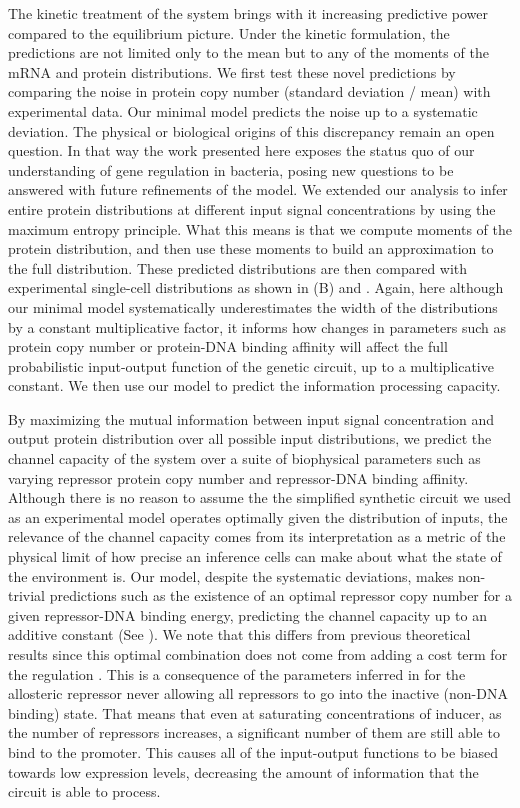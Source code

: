 The kinetic treatment of the system brings with it increasing predictive power
compared to the equilibrium picture. Under the kinetic formulation, the
predictions are not limited only to the mean but to any of the moments of the
mRNA and protein distributions. We first test these novel predictions by
comparing the noise in protein copy number (standard deviation / mean) with
experimental data. Our minimal model predicts the noise up to a systematic
deviation. The physical or biological origins of this discrepancy remain an
open question. In that way the work presented here exposes the status quo of
our understanding of gene regulation in bacteria, posing new questions to be
answered with future refinements of the model. We extended our analysis to
infer entire protein distributions at different input signal concentrations by
using the maximum entropy principle. What this means is that we compute moments
of the protein distribution, and then use these moments to build an
approximation to the full distribution. These predicted distributions are then
compared with experimental single-cell distributions as shown in
(B) and . Again, here although our minimal
model systematically underestimates the width of the distributions by a
constant multiplicative factor, it informs how changes in parameters such as
protein copy number or protein-DNA binding affinity will affect the full
probabilistic input-output function of the genetic circuit, up to a
multiplicative constant. We then use our model to predict the information
processing capacity.

By maximizing the mutual information between input signal concentration and
output protein distribution over all possible input distributions, we predict
the channel capacity of the system over a suite of biophysical parameters such
as varying repressor protein copy number and repressor-DNA binding affinity.
Although there is no reason to assume the the simplified synthetic circuit we
used as an experimental model operates optimally given the distribution of
inputs, the relevance of the channel capacity comes from its interpretation as
a metric of the physical limit of how precise an inference cells can
make about what the state of the environment is. Our model, despite the
systematic deviations, makes non-trivial predictions such as the existence of
an optimal repressor copy number for a given repressor-DNA binding energy,
predicting the channel capacity up to an additive constant (See
). We note that this differs from previous theoretical
results since this optimal combination does not come from adding a cost term
for the regulation \cite{Tkacik2011}. This is a consequence of the parameters
inferred in \cite{Razo-Mejia2018} for the allosteric repressor never allowing
all repressors to go into the inactive (non-DNA binding) state. That means that
even at saturating concentrations of inducer, as the number of repressors
increases, a significant number of them are still able to bind to the promoter.
This causes all of the input-output functions to be biased towards low
expression levels, decreasing the amount of information that the circuit is
able to process.

